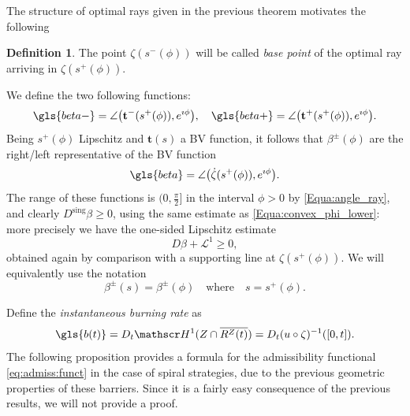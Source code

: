 \documentclass[reqno]{amsart}
\theoremstyle{definition} \newtheorem{definition}{Definition}[section]
\theoremstyle{definition} \newtheorem{remark}[definition]{Remark}
\theoremstyle{plain} \newtheorem{lemma}[definition]{Lemma}
\theoremstyle{plain} \newtheorem{proposition}[definition]{Proposition}
\theoremstyle{plain} \newtheorem{theorem}[definition]{Theorem}
\theoremstyle{plain} \newtheorem{corollary}[definition]{Corollary}
\theoremstyle{definition} \newtheorem{example}[definition]{Example}
\theoremstyle{plain} \newtheorem{claim}[clai]{Claim}
\theoremstyle{definition} \newtheorem{assumption}[definition]{Assumption}
\theoremstyle{definition} \newtheorem{observation}[definition]{Observation}
\newcommand{\sing}{\mathrm{sing}}
\newcommand{\1}{\mathbbm 1}
\renewcommand{\H}{\mathscr H}
\renewcommand{\i}{\imath}
\numberwithin{equation}{section} %
\theoremstyle{plain} \newtheorem*{theorem*}{Theorem}
\theoremstyle{plain} \newtheorem{mthm}[maintheorem]{Main Theorem}
\theoremstyle{plain} \newtheorem*{mthm*}{Main Theorem}
\theoremstyle{plain} \newtheorem*{conjecture*}{Conjecture}
\theoremstyle{plain} \newtheorem{conjecture}[definition]{Conjecture}
\theoremstyle{plain} \newtheorem*{problem*}{Problem}
\begin{document}
The structure of optimal rays given in the previous theorem motivates the following

\begin{definition}
\label{def:starting:point}
The point $\zeta(s^-(\phi))$ will be called \emph{base point} of the optimal ray arriving in $\zeta(s^+(\phi))$. 
\end{definition}

We define the two following functions:  
\begin{equation}
\label{Equa:beta_pm_phi_def}
\gls{beta-} = \angle \big( \mathbf t^-(s^+(\phi)),e^{\i \phi} \big), \quad \gls{beta+} = \angle \big( \mathbf t^+(s^+(\phi)),e^{\i \phi} \big).
\end{equation}
Being $s^+(\phi)$ Lipschitz and $\mathbf t(s)$ a BV function, it follows that $\beta^\pm(\phi)$ are the right/left representative of the BV function 
\begin{equation}\label{Equa:beta_phi_def}
\gls{beta} = \angle \big( \dot \zeta(s^+(\phi)), e^{\i \phi} \big). 
\end{equation}
The range of these functions is $( 0,\frac{\pi}{2}]$ in the interval $\phi > 0$ by \eqref{Equa:angle_ray}, and clearly $D^\sing \beta \geq 0$, using the same estimate as \eqref{Equa:convex_phi_lower}: more precisely we have the one-sided Lipschitz estimate
\begin{equation}
\label{Equa:convex_beta}
D \beta + \mathscr L^1 \geq 0,
\end{equation}
obtained again by comparison with a supporting line at $\zeta(s^+(\phi))$. We will equivalently use the notation
\begin{equation*}%
\beta^\pm(s) = \beta^\pm(\phi) \quad \text{where} \quad s = s^+(\phi).
\end{equation*}

Define the \emph{instantaneous burning rate} as 
\begin{equation}
\label{def:burning:rate}
\gls{b(t)} = D_t \H^1(Z\cap\overline{R^Z(t)}) = D_t (u \circ \zeta)^{-1}([0,t]).
\end{equation}
The following proposition provides a formula for the admissibility functional \eqref{eq:admiss:funct} in the case of spiral strategies, due to the previous geometric properties of these barriers. Since it is a fairly easy consequence of the previous results, we will not provide a proof.
\end{document}
